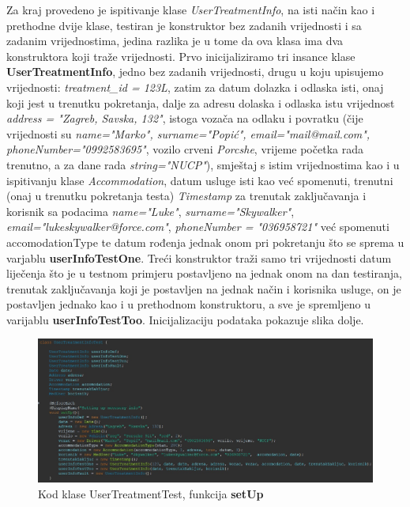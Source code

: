 			Za kraj provedeno je ispitivanje klase \textit{UserTreatmentInfo}, na isti način kao i prethodne dvije klase, testiran je konstruktor bez zadanih vrijednosti i sa zadanim vrijednostima, jedina razlika je u tome da ova klasa ima dva konstruktora koji traže vrijednosti. Prvo inicijaliziramo tri insance klase \textbf{UserTreatmentInfo}, jedno bez zadanih vrijednosti, drugu u koju upisujemo vrijednosti: \textit{treatment\_id = 123L}, zatim za datum dolazka i odlaska isti, onaj koji jest u trenutku pokretanja, dalje za adresu dolaska i odlaska istu vrijednost \textit{address = "Zagreb, Savska, 132"}, istoga vozača na odlaku i povratku (čije vrijednosti su \textit{name="Marko", surname="Popić", \newline email="mail@mail.com", phoneNumber="0992583695"}, vozilo crveni \textit{Porcshe}, vrijeme početka rada trenutno, a za dane rada \textit{string="NUCP"}), smještaj s istim vrijednostima kao i u ispitivanju klase \textit{Accommodation}, datum usluge isti kao već spomenuti, trenutni (onaj u trenutku pokretanja testa) \textit{Timestamp} za trenutak zaključavanja i korisnik sa podacima \textit{name="Luke"}, \textit{surname="Skywalker"}, \newline \textit{email="lukeskywalker@force.com"}, \textit{phoneNumber = "036958721"} već spomenuti {accomodationType} te datum rođenja jednak onom pri pokretanju što se sprema u varjablu \textbf{userInfoTestOne}. Treći konstruktor traži samo tri vrijednosti datum liječenja što je u testnom primjeru postavljeno na jednak onom na dan testiranja, trenutak zaključavanja koji je postavljen na jednak način i korisnika usluge, on je postavljen jednako kao i u prethodnom konstruktoru, a sve je spremljeno u varijablu \textbf{userInfoTestToo}. Inicijalizaciju podataka pokazuje slika dolje.
			
			\begin{figure}[H]
				\includegraphics[width=\textwidth]{slike/userTreatmentInfoPtOne.JPG}
				\caption{Kod klase UserTreatmentTest, funkcija \textbf{setUp}}
				\label{UserTreatmentInfoTestPtOne}
			\end{figure}
			
